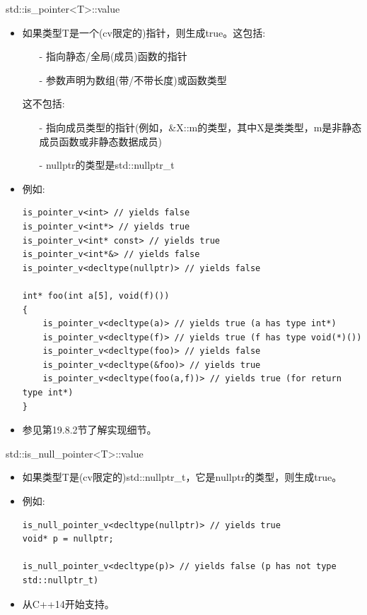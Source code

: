 std::is\_pointer<T>::value
\begin{itemize}
\item 
如果类型T是一个(cv限定的)指针，则生成true。这包括:
\begin{itemize}

\item[-] 
指向静态/全局(成员)函数的指针

\item[-] 
参数声明为数组(带/不带长度)或函数类型
\end{itemize}

这不包括:

\begin{itemize}
\item[-] 
指向成员类型的指针(例如，\&X::m的类型，其中X是类类型，m是非静态成员函数或非静态数据成员)

\item[-] 
nullptr的类型是std::nullptr\_t
\end{itemize}

\item 
例如:

\begin{lstlisting}[style=styleCXX]
is_pointer_v<int> // yields false
is_pointer_v<int*> // yields true
is_pointer_v<int* const> // yields true
is_pointer_v<int*&> // yields false
is_pointer_v<decltype(nullptr)> // yields false

int* foo(int a[5], void(f)())
{
	is_pointer_v<decltype(a)> // yields true (a has type int*)
	is_pointer_v<decltype(f)> // yields true (f has type void(*)())
	is_pointer_v<decltype(foo)> // yields false
	is_pointer_v<decltype(&foo)> // yields true
	is_pointer_v<decltype(foo(a,f))> // yields true (for return type int*)
}
\end{lstlisting}

\item 
参见第19.8.2节了解实现细节。
\end{itemize}

std::is\_null\_pointer<T>::value

\begin{itemize}
\item 
如果类型T是(cv限定的)std::nullptr\_t，它是nullptr的类型，则生成true。

\item 
例如:
\begin{lstlisting}[style=styleCXX]
is_null_pointer_v<decltype(nullptr)> // yields true
void* p = nullptr;

is_null_pointer_v<decltype(p)> // yields false (p has not type std::nullptr_t)
\end{lstlisting}

\item 
从C++14开始支持。
\end{itemize}

